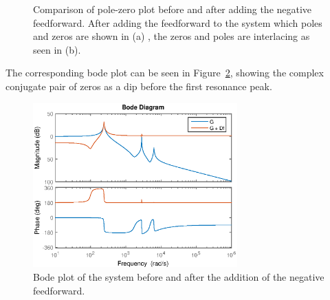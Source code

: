 \begin{figure}[h!]
  \centering %
  \qquad
  \caption{\label{fig:negfeedpzmap} Comparison of pole-zero plot before and after adding the negative feedforward. After adding the feedforward to the system which poles and zeros are shown in (a) , the zeros and poles are interlacing as seen in (b).}
\end{figure}

The corresponding bode plot can be seen in Figure~\ref{fig:bodeafterfeedf}, showing the complex conjugate pair of zeros as a dip before the first resonance peak.

\begin{figure}[h!]
  \centering
  \includegraphics[width=0.7\textwidth]{fig/matlab/bodeafterfeedf.eps}
  \caption{\label{fig:bodeafterfeedf} Bode plot of the system before and after the addition of the negative feedforward.}
\end{figure}

